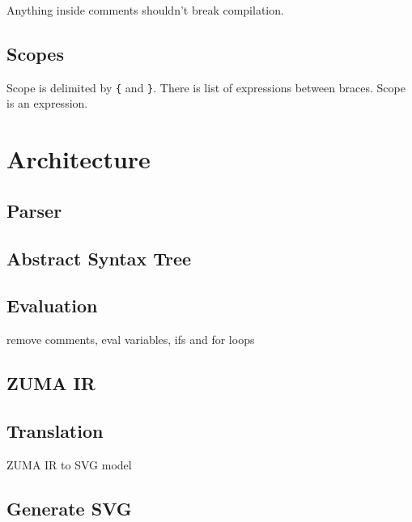 \documentclass{scrreprt}
\begin{document}
Anything inside comments shouldn't break compilation.

\section{Scopes}

Scope is delimited by \texttt{\{} and \texttt{\}}. There is list of expressions between braces. Scope is an expression.

\chapter{Architecture}

\section{Parser}

\section{Abstract Syntax Tree}

\section{Evaluation}

remove comments, eval variables, ifs and for loops

\section{ZUMA IR}

\section{Translation}

ZUMA IR to SVG model

\section{Generate SVG}
\end{document}
